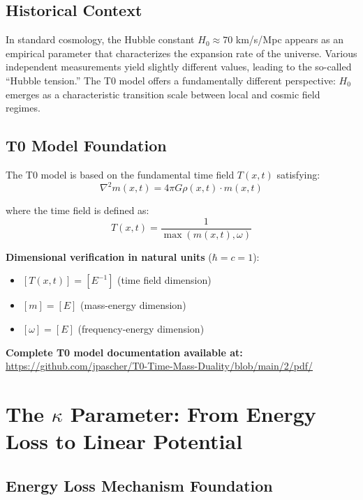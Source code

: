 \documentclass[12pt,a4paper]{article}
\newcommand{\Tfield}{T(x,t)}
\begin{document}
	\subsection{Historical Context}
	\label{subsec:historical_context}
	
	In standard cosmology, the Hubble constant $H_0 \approx 70$ km/s/Mpc appears as an empirical parameter that characterizes the expansion rate of the universe. Various independent measurements yield slightly different values, leading to the so-called ``Hubble tension.'' The T0 model offers a fundamentally different perspective: $H_0$ emerges as a characteristic transition scale between local and cosmic field regimes.
	
	\subsection{T0 Model Foundation}
	\label{subsec:t0_foundation}
	
	The T0 model is based on the fundamental time field $\Tfield$ satisfying:
	\begin{equation}
		\nabla^2 m(x,t) = 4\pi G \rho(x,t) \cdot m(x,t)
	\end{equation}
	
	where the time field is defined as:
	\begin{equation}
		\Tfield = \frac{1}{\max(m(x,t), \omega)}
	\end{equation}
	
	\textbf{Dimensional verification in natural units} ($\hbar = c = 1$):
	\begin{itemize}
		\item $[\Tfield] = [E^{-1}]$ (time field dimension)
		\item $[m] = [E]$ (mass-energy dimension)
		\item $[\omega] = [E]$ (frequency-energy dimension)
	\end{itemize}
	
	\textbf{Complete T0 model documentation available at:} \\
	\url{https://github.com/jpascher/T0-Time-Mass-Duality/blob/main/2/pdf/}
	
	\section{The $\kappa$ Parameter: From Energy Loss to Linear Potential}
	\label{sec:kappa_derivation}
	
	\subsection{Energy Loss Mechanism Foundation}
	\label{subsec:energy_loss_foundation}
	
\end{document}
